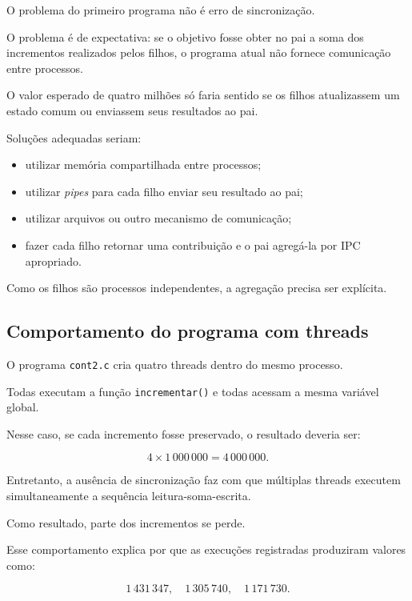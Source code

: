 O problema do primeiro programa não é erro de sincronização.

O problema é de expectativa: se o objetivo fosse obter no pai a soma dos incrementos realizados pelos filhos, o programa atual não fornece comunicação entre processos.

O valor esperado de quatro milhões só faria sentido se os filhos atualizassem um estado comum ou enviassem seus resultados ao pai.

Soluções adequadas seriam:

\begin{itemize}
    \item utilizar memória compartilhada entre processos;
    \item utilizar \emph{pipes} para cada filho enviar seu resultado ao pai;
    \item utilizar arquivos ou outro mecanismo de comunicação;
    \item fazer cada filho retornar uma contribuição e o pai agregá-la por IPC apropriado.
\end{itemize}

Como os filhos são processos independentes, a agregação precisa ser explícita.

\subsection{Comportamento do programa com threads}

O programa \texttt{cont2.c} cria quatro threads dentro do mesmo processo.

Todas executam a função \texttt{incrementar()} e todas acessam a mesma variável global.

Nesse caso, se cada incremento fosse preservado, o resultado deveria ser:

\begin{equation}
    4 \times 1\,000\,000
    =
    4\,000\,000.
\end{equation}

Entretanto, a ausência de sincronização faz com que múltiplas threads executem simultaneamente a sequência leitura-soma-escrita.

Como resultado, parte dos incrementos se perde.

Esse comportamento explica por que as execuções registradas produziram valores como:

\begin{equation}
    1\,431\,347,\quad
    1\,305\,740,\quad
    1\,171\,730.
\end{equation}

